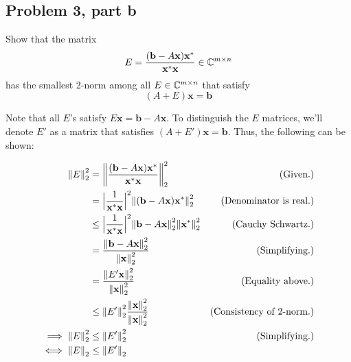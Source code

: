 \newpage
\subsection{Problem 3, part b}
Show that the matrix 
\[
E = \frac{(\textbf{b} - A\textbf{x})\textbf{x}^*}{\textbf{x}^*\textbf{x}} \in \mathbb{C}^{m\times n}
\]
has the smallest 2-norm among all $E \in \mathbb{C}^{m\times n}$ that satisfy 
\[
(A + E) \textbf{x} = \textbf{b}
\]
\partbreak
\begin{solution}

 Note that all $E$'s satisfy $E\textbf{x} = \textbf{b} - A\textbf{x}$. To distinguish the $E$ matrices, we'll denote $E'$ as a matrix that satisfies $(A+E')\textbf{x} = \textbf{b}$. Thus, the following can be shown:

 \alignbreak
 \begin{align}
     \norm{E}_2^2 &= \norm{\frac{(\textbf{b} - A\textbf{x})\textbf{x}^*}{\textbf{x}^*\textbf{x}}}^2_2 &\text{(Given.)}\nonumber\\
     &= \Big| \frac{1}{\textbf{x}^*\textbf{x}}\Big|^2 \norm{(\textbf{b} - A\textbf{x})\textbf{x}^*}_2^2 &\text{(Denominator is real.)}\nonumber\\
     &\leq \Big| \frac{1}{\textbf{x}^*\textbf{x}}\Big|^2 \norm{\textbf{b} - A\textbf{x}}_2^2\norm{\textbf{x}^*}_2^2 &\text{(Cauchy Schwartz.)}\nonumber\\
     &= \frac{\norm{\textbf{b} - A\textbf{x}}_2^2}{\norm{\textbf{x}}^2_2} &\text{(Simplifying.)}\nonumber\\
     &= \frac{\norm{E'\textbf{x}}_2^2}{\norm{\textbf{x}}_2^2} &\text{(Equality above.)}\nonumber\\
     &\leq \norm{E'}_2^2 \frac{\norm{\textbf{x}}_2^2}{\norm{\textbf{x}}_2^2} &\text{(Consistency of 2-norm.)}\nonumber\\
     \implies \norm{E}_2^2&\leq \norm{E'}_2^2 &\text{(Simplifying.)}\nonumber\\
     \iff \norm{E}_2 &\leq \norm{E'}_2 \nonumber
 \end{align}
 \alignbreak
\end{solution}

\newpage

